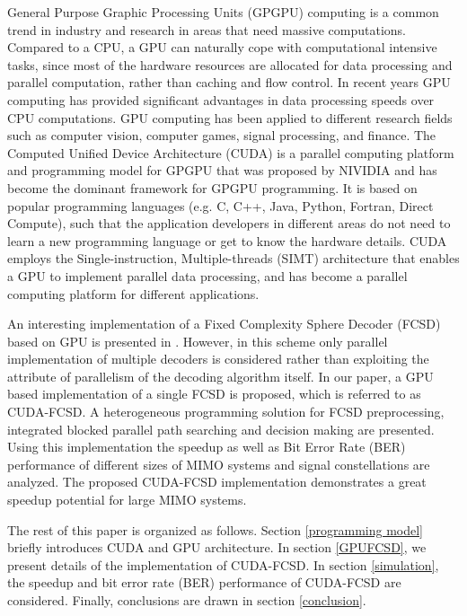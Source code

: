 \documentclass[letterpaper, 10pt, conference, twoside]{ieeeconf}
\begin{document}
General Purpose Graphic Processing Units (GPGPU) computing is a common trend in industry and research in areas that need massive computations. Compared to a CPU, a GPU can naturally cope with computational intensive tasks, since most of the hardware resources are allocated for data processing and parallel computation, rather than caching and flow control\cite{cook2013cuda}. In recent years GPU computing has provided significant advantages in data processing speeds over CPU computations\cite{nvidia2008programming}. GPU computing has been applied to different research fields such as computer vision\cite{fung2008using}, computer games\cite{blewitt2013applicability}, signal processing\cite{van2011accelerating}\cite{6671435}, and finance\cite{grauer2013accelerating}. The Computed Unified Device Architecture (CUDA)\cite{cook2013cuda}\cite{nvidia2008programming} is a parallel computing platform and programming model for GPGPU that was proposed by NIVIDIA and has become the dominant framework for GPGPU programming. It is based on popular programming languages (e.g. C, C++, Java, Python, Fortran, Direct Compute), such that the application developers in different areas do not need to learn a new programming language or get to know the hardware details. CUDA employs the Single-instruction, Multiple-threads (SIMT) architecture that enables a GPU to implement parallel data processing, and has become a parallel computing platform for different applications.

 An interesting implementation of a Fixed Complexity Sphere Decoder (FCSD) based on GPU is presented in \cite{hongyuan2010fixed}. However, in this scheme only parallel implementation of multiple decoders is considered rather than exploiting the attribute of parallelism of the decoding algorithm itself. In our paper, a GPU based implementation of a single FCSD is proposed, which is referred to as CUDA-FCSD. A heterogeneous programming solution for FCSD preprocessing, integrated blocked parallel path searching and decision making are presented. Using this implementation the speedup as well as Bit Error Rate (BER) performance of different sizes of MIMO systems and signal constellations are analyzed. The proposed CUDA-FCSD implementation demonstrates a great speedup potential for large MIMO systems.

The rest of this paper is organized as follows. Section \ref{programming model} briefly introduces CUDA and GPU architecture. In section \ref{GPUFCSD}, we present details of the implementation of CUDA-FCSD. In section \ref{simulation}, the speedup and bit error rate (BER) performance of CUDA-FCSD are considered. Finally, conclusions are drawn in section \ref{conclusion}.    
\end{document}

